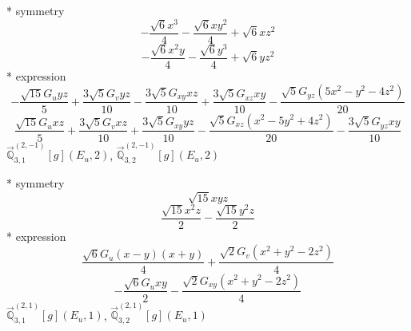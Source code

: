 \documentclass[fleqn,8pt]{jsarticle}
\begin{document}
\noindent\quad ** symmetry
\begin{dmath*}
- \frac{\sqrt{6} x^{3}}{4} - \frac{\sqrt{6} x y^{2}}{4} + \sqrt{6} x z^{2}
\end{dmath*}
\begin{dmath*}
- \frac{\sqrt{6} x^{2} y}{4} - \frac{\sqrt{6} y^{3}}{4} + \sqrt{6} y z^{2}
\end{dmath*}
\noindent\quad ** expression
\begin{dmath*}
- \frac{\sqrt{15} G_{u} y z}{5} + \frac{3 \sqrt{5} G_{v} y z}{10} - \frac{3 \sqrt{5} G_{xy} x z}{10} + \frac{3 \sqrt{5} G_{xz} x y}{10} - \frac{\sqrt{5} G_{yz} \left(5 x^{2} - y^{2} - 4 z^{2}\right)}{20}
\end{dmath*}
\begin{dmath*}
\frac{\sqrt{15} G_{u} x z}{5} + \frac{3 \sqrt{5} G_{v} x z}{10} + \frac{3 \sqrt{5} G_{xy} y z}{10} - \frac{\sqrt{5} G_{xz} \left(x^{2} - 5 y^{2} + 4 z^{2}\right)}{20} - \frac{3 \sqrt{5} G_{yz} x y}{10}
\end{dmath*}
\noindent\quad $\vec{\mathbb{Q}}_{3,1}^{(2,-1)}[g](E_{u},2)$, $\vec{\mathbb{Q}}_{3,2}^{(2,-1)}[g](E_{u},2)$

\noindent\quad ** symmetry
\begin{dmath*}
\sqrt{15} x y z
\end{dmath*}
\begin{dmath*}
\frac{\sqrt{15} x^{2} z}{2} - \frac{\sqrt{15} y^{2} z}{2}
\end{dmath*}
\noindent\quad ** expression
\begin{dmath*}
\frac{\sqrt{6} G_{u} \left(x - y\right) \left(x + y\right)}{4} + \frac{\sqrt{2} G_{v} \left(x^{2} + y^{2} - 2 z^{2}\right)}{4}
\end{dmath*}
\begin{dmath*}
- \frac{\sqrt{6} G_{u} x y}{2} - \frac{\sqrt{2} G_{xy} \left(x^{2} + y^{2} - 2 z^{2}\right)}{4}
\end{dmath*}
\noindent\quad $\vec{\mathbb{Q}}_{3,1}^{(2,1)}[g](E_{u},1)$, $\vec{\mathbb{Q}}_{3,2}^{(2,1)}[g](E_{u},1)$
\end{document}
